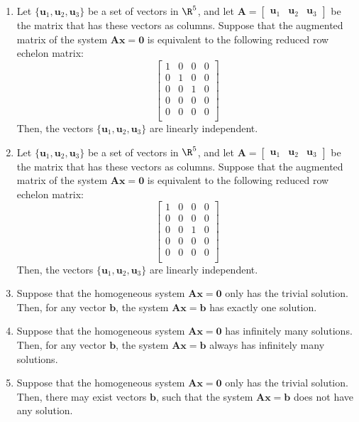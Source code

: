 \documentclass[12pt]{article}
\begin{document}
\begin{enumerate}
\item Let $\{\mathbf{u}_1, \mathbf{u}_2, \mathbf{u}_3\}$ be a set of vectors in $\R^5$, and let
$\mathbf{A}=[\begin{matrix} \mathbf{u}_1&\mathbf{u}_2&\mathbf{u}_3\end{matrix}]$ be the matrix that has these vectors as columns. 
Suppose that the augmented matrix of the system $\mathbf{A}\mathbf{x}=\mathbf{0}$ is equivalent to the following reduced row echelon matrix:
\[
\left[\begin{matrix}
1&0&0&0\\ 
0&1&0&0\\ 
0&0&1&0\\ 
0&0&0&0\\ 
0&0&0&0\\ 
\end{matrix}\right]
\]
Then, the vectors $\{\mathbf{u}_1, \mathbf{u}_2, \mathbf{u}_3\}$ are linearly independent.

\item Let $\{\mathbf{u}_1, \mathbf{u}_2, \mathbf{u}_3\}$ be a set of vectors in $\R^5$, and let
$\mathbf{A}=[\begin{matrix} \mathbf{u}_1&\mathbf{u}_2&\mathbf{u}_3\end{matrix}]$ be the matrix that has these vectors as columns. 
Suppose that the augmented matrix of the system $\mathbf{A}\mathbf{x}=\mathbf{0}$ is equivalent to the following reduced row echelon matrix:
\[
\left[\begin{matrix}
1&0&0&0\\ 
0&0&0&0\\ 
0&0&1&0\\ 
0&0&0&0\\ 
0&0&0&0\\ 
\end{matrix}\right]
\]
Then, the vectors $\{\mathbf{u}_1, \mathbf{u}_2, \mathbf{u}_3\}$ are linearly independent.

\item Suppose that the homogeneous system $\mathbf{A}\mathbf{x}=\mathbf{0}$ only has the trivial solution. Then, for any vector $\mathbf{b}$, the system $\mathbf{A}\mathbf{x}=\mathbf{b}$ has exactly one solution.

\item Suppose that the homogeneous system $\mathbf{A}\mathbf{x}=\mathbf{0}$ has infinitely many solutions. Then, for any vector $\mathbf{b}$, the system $\mathbf{A}\mathbf{x}=\mathbf{b}$ always has infinitely many solutions.

\item Suppose that the homogeneous system $\mathbf{A}\mathbf{x}=\mathbf{0}$ only has the trivial solution. Then, there may exist vectors $\mathbf{b}$, such that the system $\mathbf{A}\mathbf{x}=\mathbf{b}$ does not have any solution.

\end{enumerate}
\end{document}
